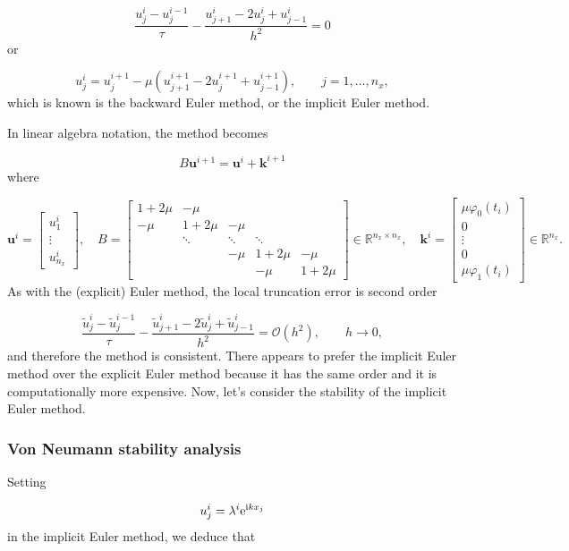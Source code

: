 \documentclass[12pt,landscape]{article}
\begin{document}
{\[
\frac{u^{i}_j - u^{i-1}_j}{\tau} - \frac{u^{i}_{j+1} - 2u^i_j + u^i_{j-1}}{h^2} = 0
\]
or

\[
u^{i}_j = u^{i+1}_j - \mu \left( u^{i+1}_{j+1} - 2u^{i+1}_j + u^{i+1}_{j-1}  \right), \qquad j = 1, \ldots, n_x,
\]
which is known is the backward Euler method, or the implicit Euler method.

In linear algebra notation, the method becomes

\[
B\mathbf{u}^{i+1} = \mathbf{u}^i + \mathbf{k}^{i+1}
\]
where

\[
\mathbf{u}^i = \begin{bmatrix}
u^{i}_{1} \\
\vdots \\
u^{i}_{n_x}
\end{bmatrix}, \quad  B = \begin{bmatrix}
1 + 2\mu & -\mu & & & \\
-\mu  & 1+2\mu & -\mu  & & \\
      & \ddots & \ddots & \ddots & \\
      &        & -\mu    & 1+ 2\mu & -\mu \\
      &        &        &-\mu      & 1+2\mu
\end{bmatrix} \in \mathbb{R}^{n_x \times n_x}, \quad \mathbf{k}^i=
\begin{bmatrix}
\mu\varphi_0(t_i) \\
0 \\
\vdots \\
0 \\
\mu \varphi_1(t_i)
\end{bmatrix} \in \mathbb{R}^{n_x}.
\]
As with the (explicit) Euler method, the local truncation error is second order

\[
\frac{\tilde{u}^{i}_j - \tilde{u}^{i-1}_j}{\tau} - \frac{\tilde{u}^{i}_{j+1} - 2\tilde{u}^i_j + \tilde{u}^i_{j-1}}{h^2} =  \mathcal{O}(h^2), \qquad h \to 0,
\]
and therefore the method is consistent.  There appears to prefer the implicit Euler method over the explicit Euler method because it has the same order and it is computationally more expensive.   Now, let's consider the stability of the implicit Euler method. 

\subsubsection{Von Neumann stability analysis}
Setting

\[
u^i_j = \lambda^i{\rm e}^{{\rm i}k x_j}
\]
in the implicit Euler method, we deduce that


}
\end{document}
